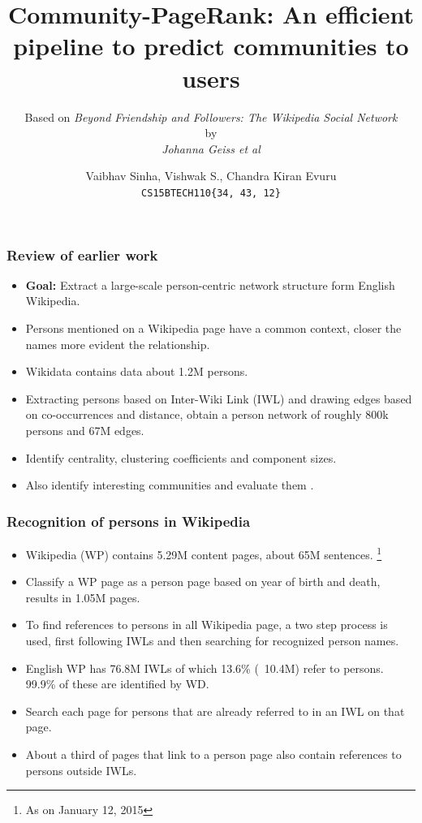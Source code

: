 \documentclass[9pt, compress]{beamer}
\title{Community-PageRank: An efficient pipeline to predict communities to users}
\subtitle{{\normalsize Based on \emph{Beyond Friendship and Followers: The Wikipedia Social Network}\\by\\\emph{Johanna Geiss et al}}}
\author{Vaibhav Sinha, Vishwak S., Chandra Kiran Evuru\\
\texttt{CS15BTECH110\{34, 43, 12\}}}
\begin{document}
	\maketitle
	

\begin{frame}[fragile]
  \frametitle{Review of earlier work}
\begin{itemize}
  \item \textbf{Goal:} Extract a large-scale person-centric 	network structure form English Wikipedia.
  \item Persons mentioned on a Wikipedia page have a common context, closer the names more evident the relationship.
  \item Wikidata contains data about 1.2M persons.
  \item Extracting persons based on Inter-Wiki Link (IWL) and drawing edges based on co-occurrences and distance, obtain a person network of roughly 800k persons and 67M edges.
  \item Identify centrality, clustering coefficients and component sizes.
  \item Also identify interesting communities and evaluate them .
  
\end{itemize}
\normalsize
\end{frame}

\begin{frame}[fragile]
	\frametitle{Recognition of persons in Wikipedia}
\begin{itemize}
\item Wikipedia (WP) contains 5.29M content pages, about 65M sentences. \footnote{As on January 12, 2015}
\item Classify a WP page as a person page based on year of birth and death, results in 1.05M pages.
\item To find references to persons in all Wikipedia page, a two step process is used, first following IWLs and then searching for 	recognized person names.
\item English WP has 76.8M IWLs of which 13.6\% (~10.4M) refer to persons. 99.9\% of these are identified by WD.
\item Search each page for persons that are already referred to in an IWL on that page.
\item About a third of pages that link to a person page also contain references to persons outside IWLs.
\end{itemize}
\end{frame}
\end{document}
